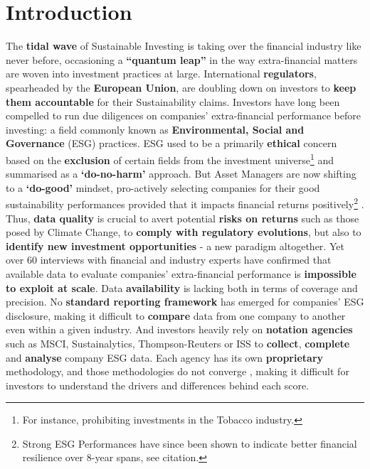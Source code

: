 \documentclass[12pt]{report}
\begin{document}
\section{Introduction}
The \textbf{tidal wave} of Sustainable Investing is taking over the financial industry like never before, occasioning a \textbf{``quantum leap''} \citep{caroletanguylepy} in the way extra-financial matters are woven into investment practices at large. International \textbf{regulators}, spearheaded by the \textbf{European Union}, are doubling down on investors to \textbf{keep them accountable} for their Sustainability claims.\newline 
Investors have long been compelled to run due diligences on companies’ extra-financial performance before investing: a field commonly known as \textbf{Environmental, Social and Governance} (ESG) practices. ESG used to be a primarily \textbf{ethical} concern based on the \textbf{exclusion} of certain fields from the investment universe\footnote{For instance, prohibiting investments in the Tobacco industry.} and summarised as a \textbf{‘do-no-harm’} approach. But Asset Managers are now shifting to a \textbf{ ‘do-good’} mindset, pro-actively selecting companies for their good sustainability performances provided that it impacts financial returns positively\footnote{Strong ESG Performances have since been shown to indicate better financial resilience over 8-year spans, see citation.} \citep{esgresilience} . Thus, \textbf{data quality}  is crucial to avert potential \textbf{risks on returns} such as those posed by Climate Change, to \textbf{comply with regulatory evolutions}, but also to \textbf{identify new investment opportunities} - a new paradigm altogether.\newline 
Yet over 60 interviews with financial and industry experts have confirmed that available data to evaluate companies’ extra-financial performance is \textbf{impossible to exploit at scale}. Data \textbf{availability} is lacking both in terms of coverage and precision. No \textbf{standard reporting framework} has emerged for companies’ ESG disclosure, making it difficult to \textbf{compare} data from one company to another even within a given industry. And investors heavily rely on \textbf{notation agencies} such as MSCI, Sustainalytics, Thompson-Reuters or ISS to \textbf{collect}, \textbf{complete} and \textbf{analyse} company ESG data. Each agency has its own \textbf{proprietary} methodology, and those methodologies do not converge \citep{notationdivergence}, making it difficult for investors to understand the drivers and differences behind each score.  
\end{document}
